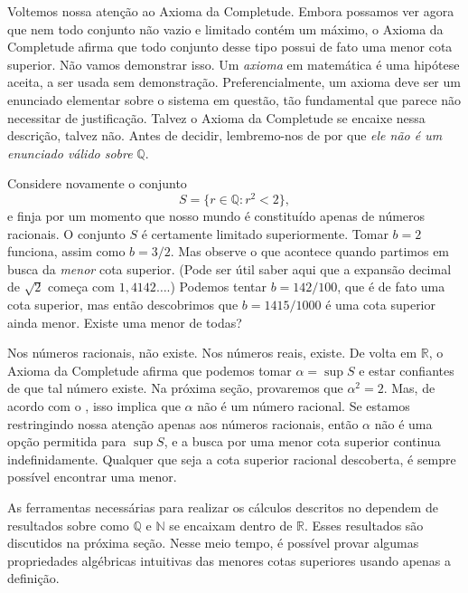 Voltemos nossa atenção ao Axioma da Completude. Embora possamos ver agora que nem todo conjunto não vazio e limitado contém um máximo, o Axioma da Completude afirma que todo conjunto desse tipo possui de fato uma menor cota superior. Não vamos demonstrar isso. Um \textit{axioma} em matemática é uma hipótese aceita, a ser usada sem demonstração. Preferencialmente, um axioma deve ser um enunciado elementar sobre o sistema em questão, tão fundamental que parece não necessitar de justificação. Talvez o Axioma da Completude se encaixe nessa descrição, talvez não. Antes de decidir, lembremo-nos de por que \textit{ele não é um enunciado válido sobre} $\mathbb{Q}$.

\begin{example}\label{ex:conjunto-r2-menor-2}
Considere novamente o conjunto
\[
S = \{ r \in \mathbb{Q} : r^{2} < 2 \},
\]
e finja por um momento que nosso mundo é constituído apenas de números racionais. O conjunto $S$ é certamente limitado superiormente. Tomar $b = 2$ funciona, assim como $b = 3/2$. Mas observe o que acontece quando partimos em busca da \textit{menor} cota superior. (Pode ser útil saber aqui que a expansão decimal de $\sqrt{2}$ começa com $1{,}4142\ldots$.) Podemos tentar $b = 142/100$, que é de fato uma cota superior, mas então descobrimos que $b = 1415/1000$ é uma cota superior ainda menor. Existe uma menor de todas?

Nos números racionais, não existe. Nos números reais, existe. De volta em $\mathbb{R}$, o Axioma da Completude afirma que podemos tomar $\alpha = \sup S$ e estar confiantes de que tal número existe. Na próxima seção, provaremos que $\alpha^{2} = 2$. Mas, de acordo com o , isso implica que $\alpha$ não é um número racional. Se estamos restringindo nossa atenção apenas aos números racionais, então $\alpha$ não é uma opção permitida para $\sup S$, e a busca por uma menor cota superior continua indefinidamente. Qualquer que seja a cota superior racional descoberta, é sempre possível encontrar uma menor.
\end{example}

As ferramentas necessárias para realizar os cálculos descritos no  dependem de resultados sobre como $\mathbb{Q}$ e $\mathbb{N}$ se encaixam dentro de $\mathbb{R}$. Esses resultados são discutidos na próxima seção. Nesse meio tempo, é possível provar algumas propriedades algébricas intuitivas das menores cotas superiores usando apenas a definição.

